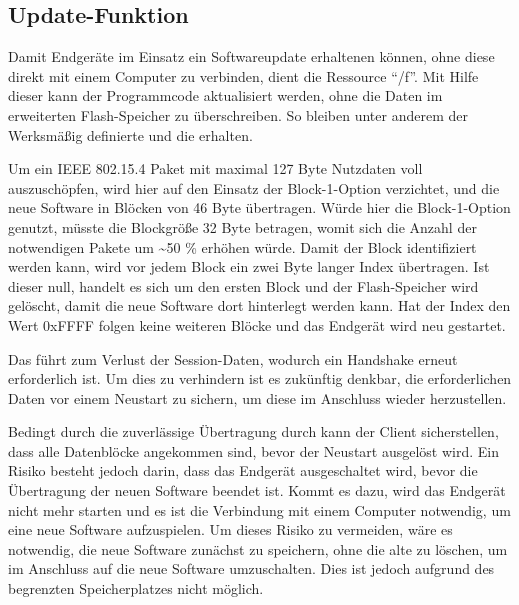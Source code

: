 \subsection{Update-Funktion}

Damit Endgeräte im Einsatz ein Softwareupdate erhaltenen können, ohne diese direkt mit einem Computer zu verbinden,
dient die Ressource "`/f"'. Mit Hilfe dieser kann der Programmcode aktualisiert werden, ohne die Daten im
erweiterten Flash-Speicher zu überschreiben. So bleiben unter anderem der Werksmäßig definierte  und die  erhalten.

Um ein IEEE 802.15.4 Paket mit maximal 127 Byte Nutzdaten voll auszuschöpfen, wird hier auf den Einsatz der Block-1-Option verzichtet, und
die neue Software in Blöcken von 46 Byte übertragen. Würde hier die Block-1-Option genutzt, müsste die Blockgröße 32 Byte betragen, womit
sich die Anzahl der notwendigen Pakete um \textasciitilde 50 \% erhöhen würde. Damit der Block identifiziert werden kann, wird vor jedem Block ein zwei
Byte langer Index übertragen. Ist dieser null, handelt es sich um den ersten Block und der Flash-Speicher wird gelöscht, damit die neue Software
dort hinterlegt werden kann. Hat der Index den Wert $ 0 $xFFFF folgen keine weiteren Blöcke und das Endgerät wird neu gestartet.

Das führt zum Verlust der Session-Daten, wodurch ein Handshake erneut erforderlich ist. Um dies zu verhindern ist es zukünftig denkbar,
die erforderlichen Daten vor einem Neustart zu sichern, um diese im Anschluss wieder herzustellen.

Bedingt durch die zuverlässige Übertragung durch  kann der Client sicherstellen, dass alle Datenblöcke angekommen sind, bevor der Neustart ausgelöst wird.
Ein Risiko besteht jedoch darin, dass das Endgerät ausgeschaltet wird, bevor die Übertragung der neuen Software beendet ist. Kommt es dazu, wird das Endgerät
nicht mehr starten und es ist die Verbindung mit einem Computer notwendig, um eine neue Software aufzuspielen. Um dieses Risiko zu vermeiden, wäre es notwendig,
die neue Software zunächst zu speichern, ohne die alte zu löschen, um im Anschluss auf die neue Software umzuschalten. Dies ist jedoch aufgrund des begrenzten
Speicherplatzes nicht möglich.